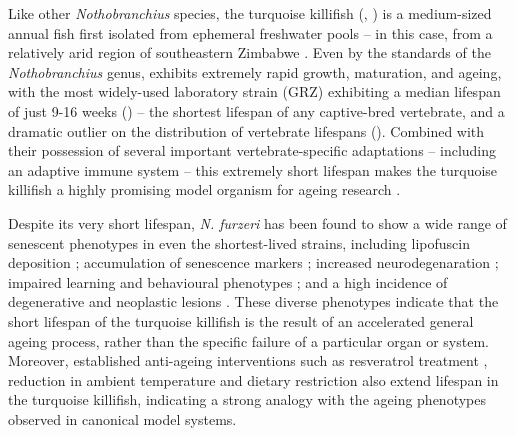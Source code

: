 Like other \textit{Nothobranchius} species, the turquoise killifish (\nfu, ) is a medium-sized annual fish first isolated from ephemeral freshwater pools -- in this case, from a relatively arid region of southeastern Zimbabwe \parencite{genade2005annual,jubb1971new}. Even by the standards of the \textit{Nothobranchius} genus, \Nfu exhibits extremely rapid growth, maturation, and ageing, with the most widely-used laboratory strain (GRZ) exhibiting a median lifespan of just 9-16 weeks \parencite{valdesalici2003lifespan,genade2005annual,terzibasi2008strains,kirschner2012map,valenzano2015genome,smith2017microbiota} () -- the shortest lifespan of any captive-bred vertebrate, and a dramatic outlier on the distribution of vertebrate lifespans (). Combined with their possession of several important vertebrate-specific adaptations -- including an adaptive immune system -- this extremely short lifespan makes the turquoise killifish a highly promising model organism for ageing research \parencite{harel2015crispr}.

Despite its very short lifespan, \textit{N. furzeri} has been found to show a wide range of senescent phenotypes in even the shortest-lived strains, including lipofuscin deposition \parencite{genade2005annual};  accumulation of senescence markers \parencite{genade2005annual};  increased neurodegenaration \parencite{valenzano2006resveratrol1,valenzano2006resveratrol2}; impaired learning and behavioural phenotypes  \parencite{genade2005annual,valenzano2006resveratrol1}; and a high incidence of degenerative and neoplastic lesions \parencite{dicicco2011histopathology}. These diverse phenotypes indicate that the short lifespan of the turquoise killifish is the result of an accelerated general ageing process, rather than the specific failure of a particular organ or system. Moreover, established anti-ageing interventions such as resveratrol treatment \parencite{valenzano2006resveratrol1}, reduction in ambient temperature \parencite{valenzano2006temperature} and dietary restriction \parencite{terzibasi2009dr} also extend lifespan in the turquoise killifish, indicating a strong analogy with the ageing phenotypes observed in canonical model systems.

